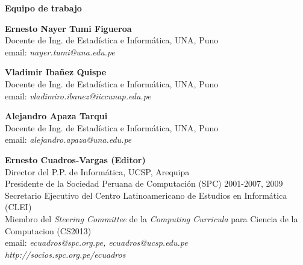 \begin{center}
{\bf \Huge Equipo de trabajo}
\end{center}
\vspace{1cm}

\begin{center}
\textbf{Ernesto Nayer Tumi Figueroa}\\
Docente de Ing. de Estadística e Informática, UNA, Puno\\
email: \textit{nayer.tumi@una.edu.pe}\\
\end{center}

\begin{center}
\textbf{Vladimir Ibañez Quispe}\\
Docente de Ing. de Estadística e Informática, UNA, Puno\\
email: \textit{vladimiro.ibanez@iiccunap.edu.pe}\\
\end{center}

\begin{center}
\textbf{Alejandro Apaza Tarqui}\\
Docente de Ing. de Estadística e Informática, UNA, Puno\\
email: \textit{alejandro.apaza@una.edu.pe}\\
\end{center}

% 

\begin{center}
\textbf{Ernesto Cuadros-Vargas (Editor)}\\
Director del P.P. de Informática, UCSP, Arequipa\\ %
Presidente de la Sociedad Peruana de Computación (SPC) 2001-2007, 2009\\
Secretario Ejecutivo del Centro Latinoamericano de Estudios en Informática (CLEI)\\
Miembro del {\it Steering Committee} de la {\it Computing Curricula} para Ciencia de la Computacion (CS2013) \\
email: \textit{ecuadros@spc.org.pe, ecuadros@ucsp.edu.pe}\\
\textit{http://socios.spc.org.pe/ecuadros}
\end{center}

